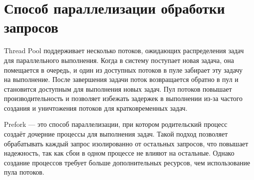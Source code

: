 \section{Способ параллелизации обработки запросов}

Thread Pool поддерживает несколько потоков, ожидающих распределения задач для параллельного выполнения. Когда в систему поступает новая задача, она помещается в очередь, и один из доступных потоков в пуле забирает эту задачу на выполнение. После завершения задачи поток возвращается обратно в пул и становится доступным для выполнения новых задач. Пул потоков повышает производительность и позволяет избежать задержек в выполнении из-за частого создания и уничтожения потоков для кратковременных задач.

Prefork --- это способ параллелизации, при котором родительский процесс создаёт дочерние процессы для выполнения задач. Такой подход позволяет обрабатывать каждый запрос изолированно от остальных запросов, что повышает надежность, так как сбои в одном процессе не влияют на остальные. Однако создание процессов требует больше дополнительных ресурсов, чем использование пула потоков.


